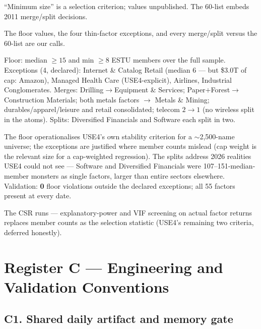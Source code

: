 \documentclass[11pt,a4paper]{article}
\begin{document}
\begin{description}[style=nextline]
  \item[USE4] ``Minimum size'' is a selection criterion; values unpublished.
    The 60-list embeds 2011 merge/split decisions.
  \item[Deviation] The floor values, the four thin-factor exceptions, and every
    merge/split versus the 60-list are our calls.
  \item[Solution] Floor: median $\geq 15$ and min $\geq 8$ ESTU members over the
    full sample. Exceptions (4, declared): Internet \& Catalog Retail (median 6
    --- but \$3.0T of cap: Amazon), Managed Health Care (USE4-explicit),
    Airlines, Industrial Conglomerates. Merges: Drilling$\to$Equipment \&
    Services; Paper$+$Forest$\to$Construction Materials; both metals factors
    $\to$ Metals \& Mining; durables/apparel/leisure and retail consolidated;
    telecom $2\to1$ (no wireless split in the atoms). Splits: Diversified
    Financials and Software each split in two.
  \item[Validity] The floor operationalises USE4's own stability criterion for a
    $\sim$2{,}500-name universe; the exceptions are justified where member
    counts mislead (cap weight is the relevant size for a cap-weighted
    regression). The splits address 2026 realities USE4 could not see ---
    Software and Diversified Financials were 107--151-median-member monsters as
    single factors, larger than entire sectors elsewhere. Validation: \textbf{0}
    floor violations outside the declared exceptions; all 55 factors present at
    every date.
  \item[Revisit when] The CSR runs --- explanatory-power and VIF screening on
    actual factor returns replaces member counts as the selection statistic
    (USE4's remaining two criteria, deferred honestly).
\end{description}

\section{Register C --- Engineering and Validation Conventions}

\subsection{C1. Shared daily artifact and memory gate}
\end{document}
